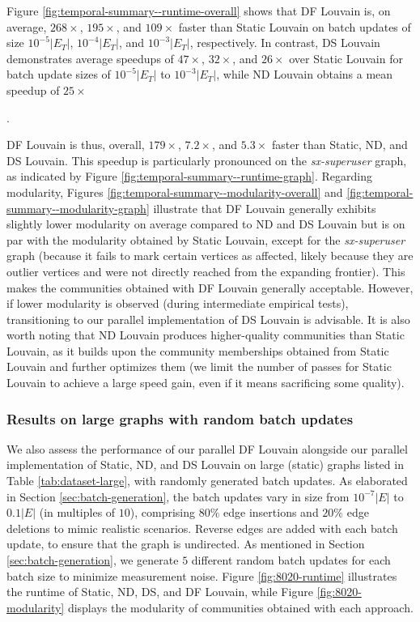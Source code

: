 Figure \ref{fig:temporal-summary--runtime-overall} shows that DF Louvain is, on average, $268\times$, $195\times$, and $109\times$ faster than Static Louvain on batch updates of size $10^{-5}|E_T|$, $10^{-4}|E_T|$, and $10^{-3}|E_T|$, respectively. In contrast, DS Louvain demonstrates average speedups of $47\times$, $32\times$, and $26\times$ over Static Louvain for batch update sizes of $10^{-5}|E_T|$ to $10^{-3}|E_T|$, while ND Louvain obtains a mean speedup of $25\times$. DF Louvain is thus, overall, $179\times$, $7.2\times$, and $5.3\times$ faster than Static, ND, and DS Louvain. This speedup is particularly pronounced on the \textit{sx-superuser} graph, as indicated by Figure \ref{fig:temporal-summary--runtime-graph}. Regarding modularity, Figures \ref{fig:temporal-summary--modularity-overall} and \ref{fig:temporal-summary--modularity-graph} illustrate that DF Louvain generally exhibits slightly lower modularity on average compared to ND and DS Louvain but is on par with the modularity obtained by Static Louvain, except for the \textit{sx-superuser} graph (because it fails to mark certain vertices as affected, likely because they are outlier vertices and were not directly reached from the expanding frontier). This makes the communities obtained with DF Louvain generally acceptable. However, if lower modularity is observed (during intermediate empirical tests), transitioning to our parallel implementation of DS Louvain is advisable. It is also worth noting that ND Louvain produces higher-quality communities than Static Louvain, as it builds upon the community memberships obtained from Static Louvain and further optimizes them (we limit the number of passes for Static Louvain to achieve a large speed gain, even if it means sacrificing some quality).


\subsubsection{Results on large graphs with random batch updates}

We also assess the performance of our parallel DF Louvain alongside our parallel implementation of Static, ND, and DS Louvain on large (static) graphs listed in Table \ref{tab:dataset-large}, with randomly generated batch updates. As elaborated in Section \ref{sec:batch-generation}, the batch updates vary in size from $10^{-7}|E|$ to $0.1|E|$ (in multiples of $10$), comprising $80\%$ edge insertions and $20\%$ edge deletions to mimic realistic scenarios. Reverse edges are added with each batch update, to ensure that the graph is undirected. As mentioned in Section \ref{sec:batch-generation}, we generate $5$ different random batch updates for each batch size to minimize measurement noise. Figure \ref{fig:8020-runtime} illustrates the runtime of Static, ND, DS, and DF Louvain, while Figure \ref{fig:8020-modularity} displays the modularity of communities obtained with each approach.

